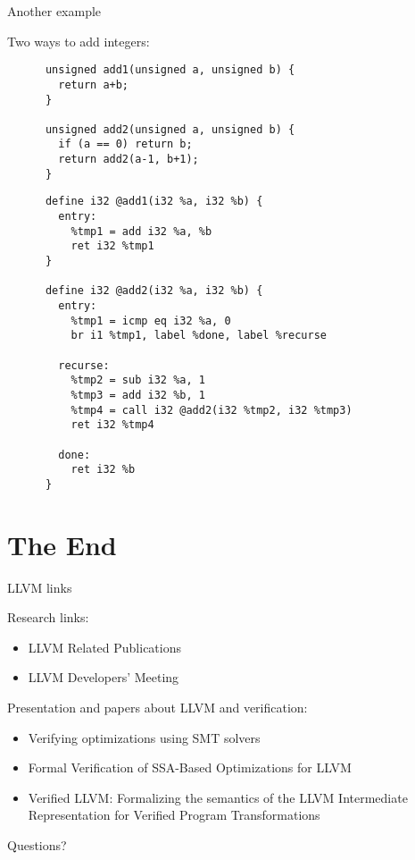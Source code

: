 \documentclass[8pt]{beamer}
\begin{document}
\begin{frame}[fragile]{Another example}
  \begin{exampleblock}{Two ways to add integers:}
    \begin{verbatim}
      unsigned add1(unsigned a, unsigned b) {
        return a+b;
      }

      unsigned add2(unsigned a, unsigned b) {
        if (a == 0) return b;
        return add2(a-1, b+1);
      }
    \end{verbatim}

    \begin{verbatim}
      define i32 @add1(i32 %a, i32 %b) {
        entry:
          %tmp1 = add i32 %a, %b
          ret i32 %tmp1
      }

      define i32 @add2(i32 %a, i32 %b) {
        entry:
          %tmp1 = icmp eq i32 %a, 0
          br i1 %tmp1, label %done, label %recurse

        recurse:
          %tmp2 = sub i32 %a, 1
          %tmp3 = add i32 %b, 1
          %tmp4 = call i32 @add2(i32 %tmp2, i32 %tmp3)
          ret i32 %tmp4

        done:
          ret i32 %b
      }
    \end{verbatim}
  \end{exampleblock}
\end{frame}

\section*{The End}

\begin{frame}[fragile]{LLVM links}
  \begin{block}{Research links:}
    \begin{itemize}
      \item LLVM Related Publications
      \item LLVM Developers' Meeting
    \end{itemize}
  \end{block}

  \begin{block}{Presentation and papers about LLVM and verification:}
    \begin{itemize}
      \item Verifying optimizations using SMT solvers
      \item Formal Verification of SSA-Based Optimizations for LLVM
      \item Verified LLVM: Formalizing the semantics of the LLVM Intermediate
        Representation for Verified Program Transformations
    \end{itemize}
  \end{block}
\end{frame}

\begin{frame}{}
  \begin{center}
    Questions?
  \end{center}
\end{frame}
\end{document}
